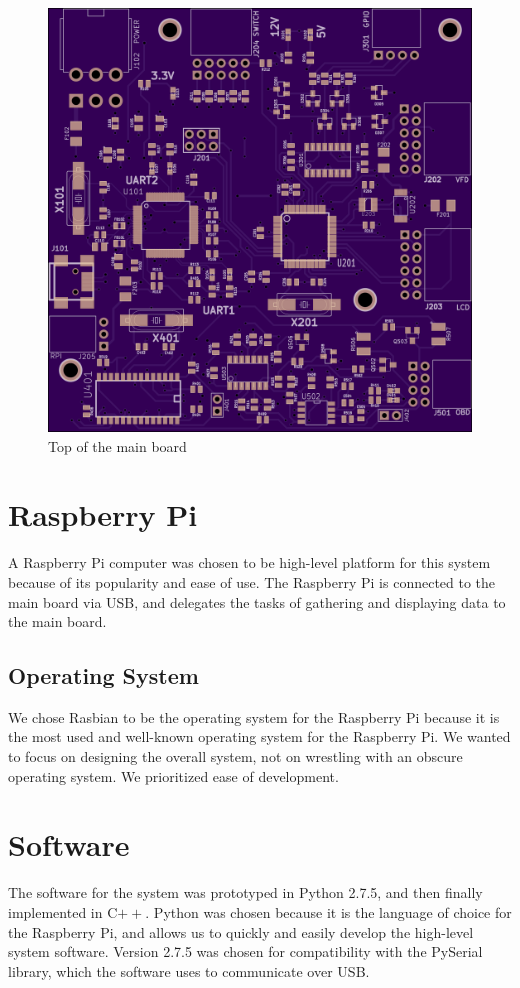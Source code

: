 \begin{figure}[h]
\includegraphics[width=\textwidth]{img/main_render_top.png}
\caption{Top of the main board}
\label{fig:main render}
\end{figure}

\section{Raspberry Pi}
\label{sec:raspi-design}

A Raspberry Pi computer was chosen to be high-level platform for this system
because of its popularity and ease of use. The Raspberry Pi is connected to the
main board via USB, and delegates the tasks of gathering and displaying data
to the main board.

\subsection{Operating System}
We chose Rasbian to be the operating system for the Raspberry Pi because it is the
most used and well-known operating system for the Raspberry Pi. We wanted to focus
on designing the overall
system, not on wrestling with an obscure operating system. We prioritized ease
of development.

\section{Software}
The software for the system was prototyped in Python 2.7.5, and then finally
implemented in C$++$. Python was chosen
because it is the language of choice for the Raspberry Pi, and allows us to
quickly and easily develop the high-level system software. Version 2.7.5 was
chosen for compatibility with the PySerial library, which the software uses to
communicate over USB.

